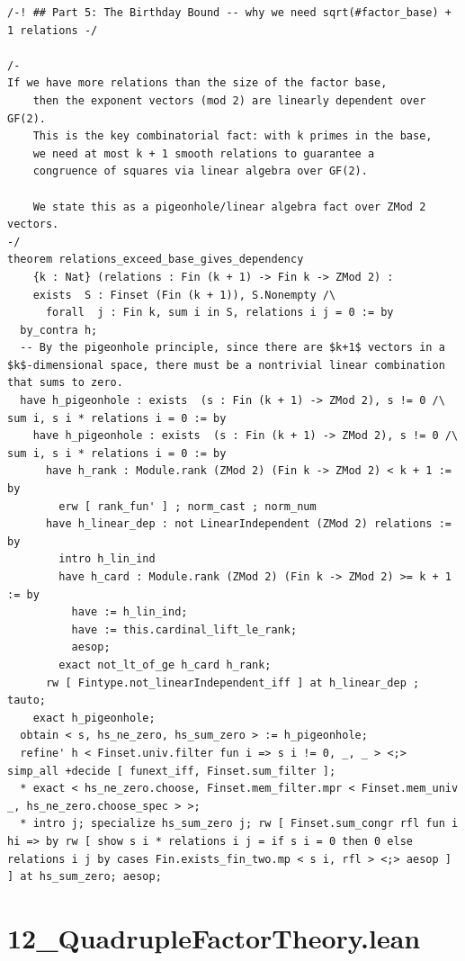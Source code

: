 \documentclass[11pt,twoside,openright]{book}
\theoremstyle{definition}
\theoremstyle{remark}
\begin{document}
\begin{lstlisting}[style=lean]
/-! ## Part 5: The Birthday Bound -- why we need sqrt(#factor_base) + 1 relations -/

/-
If we have more relations than the size of the factor base,
    then the exponent vectors (mod 2) are linearly dependent over GF(2).
    This is the key combinatorial fact: with k primes in the base,
    we need at most k + 1 smooth relations to guarantee a
    congruence of squares via linear algebra over GF(2).

    We state this as a pigeonhole/linear algebra fact over ZMod 2 vectors.
-/
theorem relations_exceed_base_gives_dependency
    {k : Nat} (relations : Fin (k + 1) -> Fin k -> ZMod 2) :
    exists  S : Finset (Fin (k + 1)), S.Nonempty /\
      forall  j : Fin k, sum i in S, relations i j = 0 := by
  by_contra h;
  -- By the pigeonhole principle, since there are $k+1$ vectors in a $k$-dimensional space, there must be a nontrivial linear combination that sums to zero.
  have h_pigeonhole : exists  (s : Fin (k + 1) -> ZMod 2), s != 0 /\ sum i, s i * relations i = 0 := by
    have h_pigeonhole : exists  (s : Fin (k + 1) -> ZMod 2), s != 0 /\ sum i, s i * relations i = 0 := by
      have h_rank : Module.rank (ZMod 2) (Fin k -> ZMod 2) < k + 1 := by
        erw [ rank_fun' ] ; norm_cast ; norm_num
      have h_linear_dep : not LinearIndependent (ZMod 2) relations := by
        intro h_lin_ind
        have h_card : Module.rank (ZMod 2) (Fin k -> ZMod 2) >= k + 1 := by
          have := h_lin_ind;
          have := this.cardinal_lift_le_rank;
          aesop;
        exact not_lt_of_ge h_card h_rank;
      rw [ Fintype.not_linearIndependent_iff ] at h_linear_dep ; tauto;
    exact h_pigeonhole;
  obtain < s, hs_ne_zero, hs_sum_zero > := h_pigeonhole;
  refine' h < Finset.univ.filter fun i => s i != 0, _, _ > <;> simp_all +decide [ funext_iff, Finset.sum_filter ];
  * exact < hs_ne_zero.choose, Finset.mem_filter.mpr < Finset.mem_univ _, hs_ne_zero.choose_spec > >;
  * intro j; specialize hs_sum_zero j; rw [ Finset.sum_congr rfl fun i hi => by rw [ show s i * relations i j = if s i = 0 then 0 else relations i j by cases Fin.exists_fin_two.mp < s i, rfl > <;> aesop ] ] at hs_sum_zero; aesop;
\end{lstlisting}

\clearpage

\section*{12\_QuadrupleFactorTheory.lean}
\end{document}
